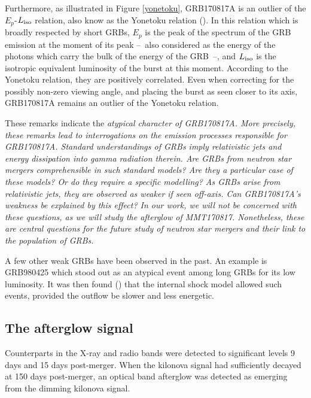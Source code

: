 Furthermore, as illustrated in Figure \ref{yonetoku}, GRB170817A is an outlier of the $E_p$-$L_{\rm{iso}}$ relation, also know as the Yonetoku relation (\cite{35}). In this relation which is broadly respected by short GRBs, $E_p$ is the peak of the spectrum of the GRB emission at the moment of its peak --~also considered as the energy of the photons which carry the bulk of the energy of the GRB~--, and $L_{\rm{iso}}$ is the isotropic equivalent luminosity of the burst at this moment. According to the Yonetoku relation, they are positively correlated. Even when correcting for the possibly non-zero viewing angle, and placing the burst as seen closer to its axis, GRB170817A remains an outlier of the Yonetoku relation.


These remarks indicate the \it{atypical} character of GRB170817A. More precisely, these remarks lead to interrogations on the emission processes responsible for GRB170817A. Standard understandings of GRBs imply relativistic jets and energy dissipation into gamma radiation therein. Are GRBs from neutron star mergers comprehensible in such standard models? Are they a particular case of these models? Or do they require a specific modelling? As GRBs arise from relativistic jets, they are observed as weaker if seen off-axis. Can GRB170817A's weakness be explained by this effect? In our work, we will not be concerned with these questions, as we will study the afterglow of MMT170817. Nonetheless, these are central questions for the future study of neutron star mergers and their link to the population of GRBs.

A few other weak GRBs have been observed in the past. An example is GRB980425 which stood out as an atypical event among long GRBs for its low luminosity. It was then found (\cite{50}) that the internal shock model allowed such events, provided the outflow be slower and less energetic.


\subsection{The afterglow signal}
\label{ags}
Counterparts in the X-ray and radio bands were detected to significant levels 9 days and 15 days post-merger. When the kilonova signal had sufficiently decayed at 150 days post-merger, an optical band afterglow was detected as emerging from the dimming kilonova signal.

